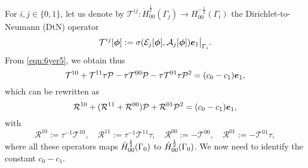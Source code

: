 \documentclass[a4paper,10pt,reqno]{amsart}
\begin{document}
For $i,j\in\{0,1\}$, let us denote by    
$\mathcal{T}^{ij}:\dot H^{\frac{1}{2}}_{00}(\Gamma_j)\to
H^{-\frac{1}{2}}_{00}(\Gamma_i)$ the Dirichlet-to-Neumann (DtN) operator  
\[
    \mathcal{T}^{ij}[{\bm \phi}]:=\sigma(\mathcal{E}_j[{\bm \phi}],\mathcal{A}_j[{\bm \phi}]){\bm e}_1\big\vert_{\Gamma_i}.
\] 
From \cref{eqn:6yer5}, we obtain thus    
\[
    \mathcal{T}^{10}+\mathcal{T}^{11} \tau \mathcal{P} -
    \tau\mathcal{T}^{00}\mathcal{P}-\tau\mathcal{T}^{01}\tau\mathcal{P}^{2}=(c_0-c_1)\e_1,
\] 
which can be rewritten as   
\[
    \mathcal{R}^{10}+(\mathcal{R}^{11}+
    \mathcal{R}^{00})\mathcal{P}+\mathcal{R}^{01}\mathcal{P}^{2}=(c_0-c_1){\bm e}_1, 
\]  
with 
\[
\mathcal{R}^{10}:=\tau^{-1}\mathcal{T}^{10}, \quad     
    \mathcal{R}^{11}:=\tau^{-1}\mathcal{T}^{11}\tau, \quad  
    \mathcal{R}^{00}:=-\mathcal{T}^{00}, \quad  
    \mathcal{R}^{01}:=-\mathcal{T}^{01}\tau,
\] 
where all these operators maps $\dot{H}^{\frac{1}{2}}_{00}(\Gamma_0) $ to $\dot{H}^{\frac{1}{2}}_{00}(\Gamma_0)$.
We now need to identify the constant $c_0-c_1$.
%


\end{document}
